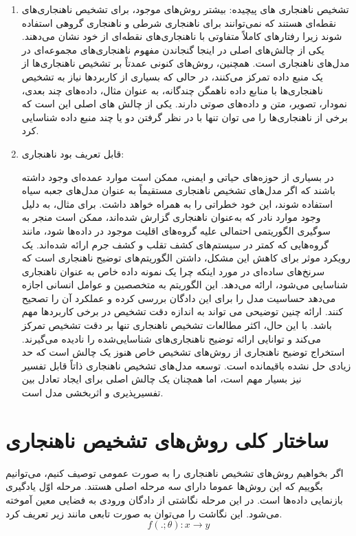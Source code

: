 \documentclass[12pt,a4paper]{report}
\begin{document}
\begin{enumerate}
{}

\item{
تشخیص ناهنجاری های پیچیده:
بیشتر روش‌های موجود، برای تشخیص ناهنجاری‌های نقطه‌ای هستند که نمی‌توانند برای ناهنجاری شرطی و ناهنجاری گروهی استفاده شوند زیرا رفتارهای کاملاً متفاوتی با ناهنجاری‌های نقطه‌ای از خود نشان می‌دهند. یکی از چالش‌های اصلی در اینجا گنجاندن مفهوم ناهنجاری‌های مجموعه‌ای در مدل‌های ناهنجاری است. همچنین، روش‌های کنونی عمدتاً بر تشخیص ناهنجاری‌ها از یک منبع داده تمرکز می‌کنند، در حالی که بسیاری از کاربردها نیاز به تشخیص ناهنجاری‌ها با منابع داده ناهمگن چندگانه، به عنوان مثال، داده‌های چند بعدی، نمودار، تصویر، متن و داده‌های صوتی دارند. یکی از چالش های اصلی این است که برخی از ناهنجاری‌ها را می توان تنها با در نظر گرفتن دو یا چند منبع داده شناسایی کرد.
}

\item {
قابل تعریف بود ناهنجاری:

در بسیاری از حوزه‌های حیاتی و ایمنی، ممکن است موارد عمده‌ای وجود داشته باشند که اگر مدل‌های تشخیص ناهنجاری مستقیماً به عنوان مدل‌های جعبه سیاه استفاده شوند، این خود خطراتی را به همراه خواهد داشت. برای مثال، به دلیل وجود موارد نادر که به‌عنوان ناهنجاری گزارش شده‌اند، ممکن است منجر به سوگیری الگوریتمی احتمالی علیه گروه‌های اقلیت موجود در داده‌ها شود، مانند گروه‌هایی که کمتر در سیستم‌های کشف تقلب و کشف جرم ارائه شده‌اند. یک رویکرد موثر برای کاهش این مشکل، داشتن الگوریتم‌های توضیح ناهنجاری است که سرنخ‌های ساده‌ای در مورد اینکه چرا یک نمونه داده خاص به عنوان ناهنجاری شناسایی می‌شود، ارائه می‌دهد. این الگوریتم به متخصصین و عوامل انسانی اجازه می‌دهد  حساسیت مدل را برای این دادگان بررسی کرده و عملکرد آن را تصحیح کنند. ارائه چنین توضیحی می تواند به اندازه دقت تشخیص در برخی کاربرد‌ها مهم باشد. با این حال، اکثر مطالعات تشخیص ناهنجاری تنها بر دقت تشخیص تمرکز می‌کند و توانایی ارائه توضیح ناهنجاری‌های شناسایی‌شده را نادیده می‌گیرند. استخراج توضیح ناهنجاری از روش‌های تشخیص خاص هنوز یک چالش است که حد زیادی حل نشده باقیمانده است. توسعه مدل‌های تشخیص ناهنجاری ذاتاً قابل تفسیر نیز بسیار مهم است، اما همچنان یک چالش اصلی برای ایجاد تعادل بین تفسیرپذیری و اثربخشی مدل است.
}
\end{enumerate}
\section{ساختار کلی روش‌های تشخیص ناهنجاری}

	اگر بخواهیم روش‌های تشخیص ناهنجاری را به صورت عمومی توصیف کنیم، می‌توانیم بگوییم که این روش‌ها عموما دارای سه مرحله اصلی هستند. مرحله اوّل یادگیری بازنمایی داد‌ه‌ها است. در این مرحله نگاشتی از دادگان ورودی به فضایی معین آموخته می‌شود. این نگاشت را می‌توان به صورت تابعی مانند زیر تعریف کرد.
\begin{equation}
f(.;\theta): x \rightarrow y
\end{equation}
	
\end{document}
